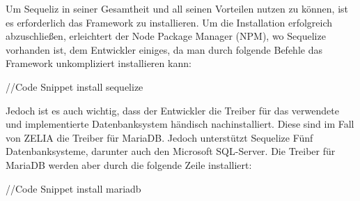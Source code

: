 
Um Sequeliz in seiner Gesamtheit und all seinen Vorteilen nutzen zu können, ist es erforderlich das Framework zu installieren. Um die Installation erfolgreich abzuschließen, erleichtert der Node Package Manager (NPM), wo Sequelize vorhanden ist, dem Entwickler einiges, da man durch folgende Befehle das Framework unkompliziert installieren kann:

//Code Snippet install sequelize

Jedoch ist es auch wichtig, dass der Entwickler die Treiber für das verwendete und implementierte Datenbanksystem händisch nachinstalliert. Diese sind im Fall von ZELIA die Treiber für MariaDB. Jedoch unterstützt Sequelize Fünf Datenbanksysteme, darunter auch den Microsoft SQL-Server. Die Treiber für MariaDB werden aber durch die folgende Zeile installiert:

//Code Snippet install mariadb
